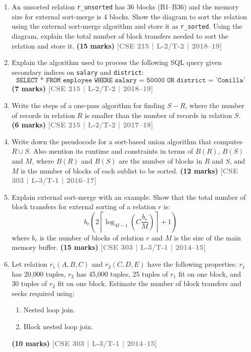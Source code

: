 \documentclass[12pt,a3paper]{article}
\newcommand{\yr}[1]{\hfill\textcolor{gray}{\small\textbf{[#1]}}}
\newcommand{\mk}[1]{\textcolor{orange!70!black}{\small\textbf{(#1 marks)}}}
\begin{document}
\begin{enumerate}
\item An unsorted relation \texttt{r\_unsorted} has 36 blocks (B1--B36) and the memory size for external sort-merge is 4 blocks. Show the diagram to sort the relation using the external sort-merge algorithm and store it as \texttt{r\_sorted}. Using the diagram, explain the total number of block transfers needed to sort the relation and store it.
  \mk{15} \yr{CSE 215 | L-2/T-2 | 2018--19}

\item Explain the algorithm used to process the following SQL query given secondary indices on \texttt{salary} and \texttt{district}:
\[\texttt{SELECT * FROM employee WHERE salary = 50000 OR district = 'Comilla'}\]
\mk{7} \yr{CSE 215 | L-2/T-2 | 2018--19}

\item Write the steps of a one-pass algorithm for finding $S - R$, where the number of records in relation $R$ is smaller than the number of records in relation $S$.
\mk{6} \yr{CSE 215 | L-2/T-2 | 2017--18}

\item Write down the pseudocode for a sort-based union algorithm that computes $R \cup S$. Also mention its runtime and constraints in terms of $B(R)$, $B(S)$ and $M$, where $B(R)$ and $B(S)$ are the number of blocks in $R$ and $S$, and $M$ is the number of blocks of each sublist to be sorted.
\mk{12} \yr{CSE 303 | L-3/T-1 | 2016--17}

\item Explain external sort-merge with an example. Show that the total number of block transfers for external sorting of a relation $r$ is:
\[b_r\!\left(2\left\lceil\log_{M-1}(C\dfrac{b_r}{M})\right\rceil + 1\right)\]
where $b_r$ is the number of blocks of relation $r$ and $M$ is the size of the main memory buffer.
\mk{15} \yr{CSE 303 | L-3/T-1 | 2014--15}

\item Let relation $r_1(A, B, C)$ and $r_2(C, D, E)$ have the following properties: $r_1$ has 20,000 tuples, $r_2$ has 45,000 tuples, 25 tuples of $r_1$ fit on one block, and 30 tuples of $r_2$ fit on one block. Estimate the number of block transfers and seeks required using:
\begin{enumerate}
  \item Nested loop join.
  \item Block nested loop join.
\end{enumerate}
\mk{10} \yr{CSE 303 | L-3/T-1 | 2014--15}


\end{enumerate}
\end{document}
